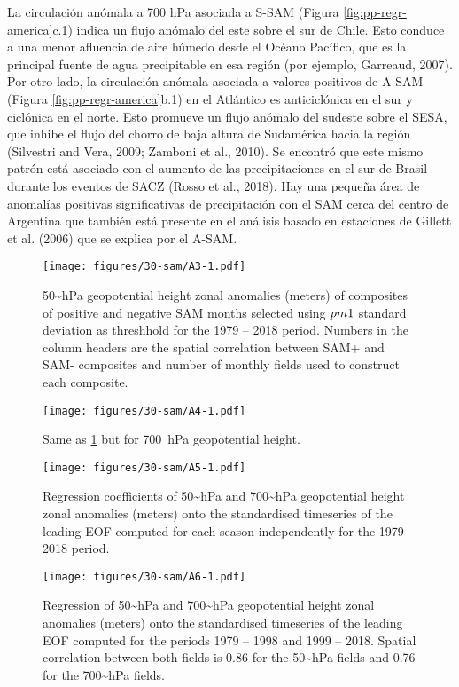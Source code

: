 \documentclass[12pt,oneside]{reedthesis}
\begin{document}
La circulación anómala a 700 hPa asociada a S\nobreakdash-SAM (Figura \ref{fig:pp-regr-america}c.1) indica un flujo anómalo del este sobre el sur de Chile. Esto conduce a una menor afluencia de aire húmedo desde el Océano Pacífico, que es la principal fuente de agua precipitable en esa región (por ejemplo, Garreaud, 2007). Por otro lado, la circulación anómala asociada a valores positivos de A\nobreakdash-SAM (Figura \ref{fig:pp-regr-america}b.1) en el Atlántico es anticiclónica en el sur y ciclónica en el norte. Esto promueve un flujo anómalo del sudeste sobre el SESA, que inhibe el flujo del chorro de baja altura de Sudamérica hacia la región (Silvestri and Vera, 2009; Zamboni et al., 2010). Se encontró que este mismo patrón está asociado con el aumento de las precipitaciones en el sur de Brasil durante los eventos de SACZ (Rosso et al., 2018).
Hay una pequeña área de anomalías positivas significativas de precipitación con el SAM cerca del centro de Argentina que también está presente en el análisis basado en estaciones de Gillett et al. (2006) que se explica por el A\nobreakdash-SAM.


\begin{figure}
\centering
\texttt{[image: figures/30-sam/A3-1.pdf]}
\caption{\label{fig:A3}50\textasciitilde hPa geopotential height zonal anomalies (meters) of composites of positive and negative SAM months selected using \(\\pm1\) standard deviation as threshhold for the 1979 -- 2018 period. Numbers in the column headers are the spatial correlation between SAM+ and SAM- composites and number of monthly fields used to construct each composite.}
\end{figure}

\begin{figure}
\centering
\texttt{[image: figures/30-sam/A4-1.pdf]}
\caption{\label{fig:A4}Same as \ref{fig:A3} but for 700~hPa geopotential height.}
\end{figure}

\begin{figure}
\centering
\texttt{[image: figures/30-sam/A5-1.pdf]}
\caption{\label{fig:A5}Regression coefficients of 50\textasciitilde hPa and 700\textasciitilde hPa geopotential height zonal anomalies (meters) onto the standardised timeseries of the leading EOF computed for each season independently for the 1979 -- 2018 period.}
\end{figure}

\begin{figure}
\centering
\texttt{[image: figures/30-sam/A6-1.pdf]}
\caption{\label{fig:A6}Regression of 50\textasciitilde hPa and 700\textasciitilde hPa geopotential height zonal anomalies (meters) onto the standardised timeseries of the leading EOF computed for the periods 1979 -- 1998 and 1999 -- 2018. Spatial correlation between both fields is 0.86 for the 50\textasciitilde hPa fields and 0.76 for the 700\textasciitilde hPa fields.}
\end{figure}
\end{document}
